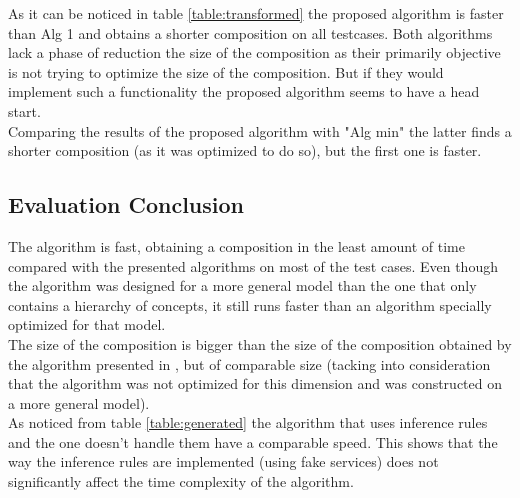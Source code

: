 \documentclass[12pt]{article}
\theoremstyle{definition}
\begin{document}
		As it can be noticed in table \ref{table:transformed} the proposed algorithm is faster than Alg 1 and obtains a shorter composition on all testcases. Both algorithms lack a phase of reduction the size of the composition as their primarily objective is not trying to optimize the size of the composition. But if they would implement such a functionality the proposed algorithm seems to have a head start. \\
		Comparing the results of the proposed algorithm with "Alg min" the latter finds a shorter composition (as it was optimized to do so), but the first one is faster.
		\subsection{Evaluation Conclusion}
		The algorithm is fast, obtaining a composition in the least amount of time compared with the presented algorithms on most of the test cases. Even though the algorithm was designed for a more general model than the one that only contains a hierarchy of concepts, it still runs faster than an algorithm specially optimized for that model.\\
		The size of the composition is bigger than the size of the composition obtained by the algorithm presented in \cite{spanioli}, but of comparable size (tacking into consideration that the algorithm was not optimized for this dimension and was constructed on a more general model).\\
		As noticed from table \ref{table:generated} the algorithm that uses inference rules and the one doesn't handle them have a comparable speed. This shows that the way the inference rules are implemented (using fake services) does not significantly affect the time complexity of the algorithm.

\newpage
\end{document}
